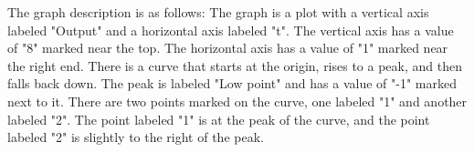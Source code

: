 The graph description is as follows: The graph is a plot with a vertical axis labeled "Output" and a horizontal axis labeled "t". The vertical axis has a value of "8" marked near the top. The horizontal axis has a value of "1" marked near the right end. There is a curve that starts at the origin, rises to a peak, and then falls back down. The peak is labeled "Low point" and has a value of "-1" marked next to it. There are two points marked on the curve, one labeled "1" and another labeled "2". The point labeled "1" is at the peak of the curve, and the point labeled "2" is slightly to the right of the peak.